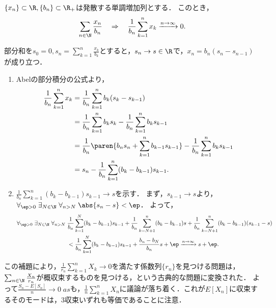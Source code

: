 \documentclass[uplatex,dvipdfmx]{jsreport}
\begin{document}
\begin{lemma}[Kronecker]
    $\{x_n\}\subset\R,\{b_n\}\subset\R_+$は発散する単調増加列とする．
    このとき，
    \[\sum_{n\in\N}\frac{x_n}{b_n}\quad\Rightarrow\quad \frac{1}{b_n}\sum_{k=1}^nx_k\xrightarrow{n\to\infty}0.\]
\end{lemma}
\begin{Proof}
    部分和を$s_0=0,s_n=\sum^n_{k=1}\frac{x_k}{b_k}$とすると，$s_n\to s\in\R$で，$x_n=b_n(s_n-s_{n-1})$が成り立つ．
    \begin{enumerate}
        \item Abelの部分積分の公式より，
        \begin{align*}
            \frac{1}{b_n}\sum^n_{k=1}x_k&=\frac{1}{b_n}\sum^n_{k=1}b_k(s_k-s_{k-1})\\
            &=\frac{1}{b_n}\sum^n_{k=1}b_ks_k-\frac{1}{b_n}\sum_{k=1}^nb_ks_{k-1}\\
            &=\frac{1}{b_n}\paren{b_ns_n+\sum^n_{k=1}b_{k-1}s_{k-1}}-\frac{1}{b_n}\sum^n_{k=1}b_ks_{k-1}\\
            &=s_n-\frac{1}{b_n}\sum^n_{k=1}(b_k-b_{k-1})s_{k-1}.
        \end{align*}
        \item $\frac{1}{b_n}\sum^n_{k=1}(b_k-b_{k-1})s_{k-1}\to s$を示す．
        まず，$s_{k-1}\to s$より，$\forall_{\ep>0}\;\exists_{N\in\N}\;\forall_{n>N}\;\abs{s_n-s}<\ep$．
        よって，
        \begin{align*}
            \forall_{\ep>0}\;\exists_{N\in\N}\;\forall_{n>N}\;&\frac{1}{b_n}\sum^N_{k=1}(b_k-b_{k-1})s_{k-1}+\frac{1}{b_n}\sum_{k=N+1}^n(b_k-b_{k-1})s+\frac{1}{b_n}\sum^n_{k=N+1}(b_k-b_{k-1})(s_{k-1}-s)\\
            &<\frac{1}{b_n}\sum^N_{k=1}(b_k-b_{k-1})s_{k-1}+\frac{b_n-b_N}{b_n}s+\ep\xrightarrow{n\to\infty}s+\ep.
        \end{align*}
    \end{enumerate}
\end{Proof}
\begin{remarks}[概収束への議論の還元]
    この補題により，$\frac{1}{r_n}\sum^n_{k=1}X_k\to0$を満たす係数列$\{r_n\}$を見つける問題は，$\sum_{n\in\N}\frac{X_n}{r_n}$が概収束するものを見つける，という古典的な問題に変換された．
    よって$\frac{S_n-E[S_n]}{n}\to0\;as$も，$\frac{1}{n}\sum_{k=1}^nX_n$に議論が落ち着く．これが$E[X_n]$に収束するそのモードは，3収束いずれも等価であることに注意．
\end{remarks}
\end{document}
